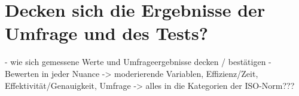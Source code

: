 \section{Decken sich die Ergebnisse der Umfrage und des Tests?}
-	wie sich gemessene Werte und Umfrageergebnisse decken / bestätigen
-	Bewerten in jeder Nuance
-> moderierende Variablen, Effizienz/Zeit, Effektivität/Genauigkeit, Umfrage
-> alles in die Kategorien der ISO-Norm???